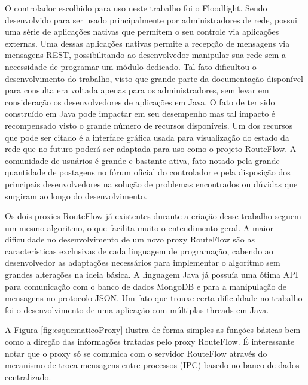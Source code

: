O controlador escolhido para uso neste trabalho foi 
o Floodlight. Sendo desenvolvido para ser usado
principalmente por  administradores de rede, possui uma 
série de aplicações nativas que permitem o seu controle
via aplicações externas. Uma dessas aplicações nativas 
permite a recepção de mensagens via mensagens REST,
possibilitando ao desenvolvedor manipular sua rede sem
a necessidade de programar um módulo dedicado. Tal fato
dificultou o desenvolvimento do trabalho, visto que grande 
parte da documentação disponível para consulta era voltada
apenas para os administradores, sem levar em consideração os 
desenvolvedores de aplicações em Java. O fato
de ter sido construído em Java pode impactar em seu desempenho
mas tal impacto é recompensado visto o grande número de 
recursos disponíveis. Um dos recursos que pode ser citado
é a interface gráfica usada para visualização do estado da rede que
no futuro poderá ser adaptada para uso como o projeto 
RouteFlow. A comunidade de usuários é grande e bastante
ativa, fato notado pela grande quantidade de postagens no
fórum oficial do controlador e pela disposição dos principais
desenvolvedores na solução de problemas encontrados ou
dúvidas que surgiram ao longo do desenvolvimento.

Os dois proxies RouteFlow já existentes durante a 
criação desse trabalho seguem um mesmo algoritmo, o que 
facilita muito o entendimento geral. A maior dificuldade no
desenvolvimento de um novo proxy RouteFlow são
as características exclusivas de cada linguagem de programação,
cabendo ao desenvolvedor as adaptações necessários para 
implementar o algoritmo sem grandes alterações
na ideia básica. A linguagem Java já possuía uma
ótima API para comunicação com o banco de dados MongoDB
e para a manipulação de mensagens no protocolo JSON. Um fato
que trouxe certa dificuldade no trabalho foi o desenvolvimento
de uma aplicação com múltiplas threads em Java. 

A Figura \ref{fig:esquematicoProxy} ilustra de forma simples as
funções básicas bem como a direção das informações tratadas
pelo proxy RouteFlow. É interessante notar que o 
proxy só se comunica com o servidor RouteFlow através
do mecanismo de troca mensagens entre processos (IPC) basedo
no banco de dados centralizado.
\newline
\newline
\newline
\newline


